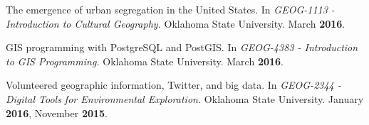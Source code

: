 \begin{cventries}
  \cventry
    {}
    {}
    {}
    {}
    {
       \begin{cvitems}
          \vspace{-3mm}
        \item {The emergence of urban segregation in the United States. In
            \textit{GEOG-1113 - Introduction to Cultural Geography.} Oklahoma
            State University. March \textbf{2016}.}
          \end{cvitems}
        } %

  \cventry
    {}
    {}
    {}
    {}
    {
      \begin{cvitems}
        \vspace{-3mm}
      \item {GIS programming with PostgreSQL and PostGIS. In \textit{GEOG-4383 -
            Introduction to GIS Programming.} Oklahoma State University. March
          \textbf{2016}.}
            \end{cvitems}
        } %

  \cventry
    {}
    {}
    {}
    {}
    {
      \begin{cvitems}
        \vspace{-3mm}
      \item Volunteered geographic information, Twitter, and big data. In
        {\textit{GEOG-2344 - Digital Tools for Environmental Exploration.}
          Oklahoma State University. January \textbf{2016}, November
          \textbf{2015}}.
        \end{cvitems}
    }

\end{cventries}